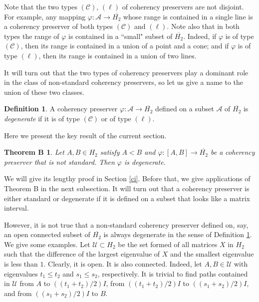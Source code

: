 \documentclass[10pt]{amsart}
\newtheorem*{theoremb}{Theorem B}
\theoremstyle{definition}
\newtheorem{definition}[theorem]{Definition}
\theoremstyle{remark}
\numberwithin{subsection}{section}
\numberwithin{equation}{section}
\newcommand\oH{{\overline{H_2}}}
\begin{document}
Note that the two types $(\mathcal{C})$, $(\ell)$ of coherency preservers are not disjoint. 
For example, any mapping  $\varphi\colon \mathcal{A}\to \oH$ whose range is contained in a single line is a coherency preserver of both types $(\mathcal{C})$ and $(\ell)$. 
Note also that in both types the range of $\varphi$ is contained in a ``small" subset of $\oH$. 
Indeed, if $\varphi$ is of type $(\mathcal{C})$, then its range is contained in a union of a point and a cone; and if $\varphi$ is of type $(\ell)$, then its range is contained in a union of two lines.

It will turn out that the two types of coherency preservers play a dominant role in the class of non-standard coherency preservers, so let us give a name to the union of these two classes.


\begin{definition}\label{degspl}
A coherency preserver $\varphi \colon \mathcal{A} \to \oH$ defined on a subset $\mathcal{A}$ of $\oH$ is \emph{degenerate}  if it is of type $(\mathcal{C})$ or of type $(\ell)$.
\end{definition}

Here we present the key result of the current section. 
\begin{theoremb}
Let $A, B\in H_2$ satisfy $A<B$ and $\varphi\colon [A, B]\to \oH$ be a coherency preserver that is not standard. Then $\varphi$ is degenerate. 
\end{theoremb}
We will give its lengthy proof in Section \ref{ci}. 
Before that, we give applications of Theorem B in the next subsection.
It will turn out that a coherency preserver is either standard or degenerate if it is defined on a subset that looks like a matrix interval.

However, it is not true that a non-standard coherency preserver defined on, say, an open connected subset of $\oH$ is always degenerate in the sense of Definition \ref{degspl}. 
We give some examples.
Let $\mathcal{U}\subset H_2$ be the set formed of all matrices $X$ in $H_2$ such that the difference of the largest eigenvalue of $X$ and the smallest eigenvalue is less than $1$. Clearly, it is open. It is also connected. Indeed, let $A,B \in \mathcal{U}$ with eigenvalues $t_1 \le t_2$ and $s_1 \le s_2$, respectively. It is trivial to find paths contained in $\mathcal{U}$ from $A$ to $((t_1 + t_2)/2)I$,   from $((t_1 + t_2)/2)I$ to $((s_1 + s_2)/2)I$, and from $((s_1 + s_2)/2)I$ to $B$.
\end{document}
